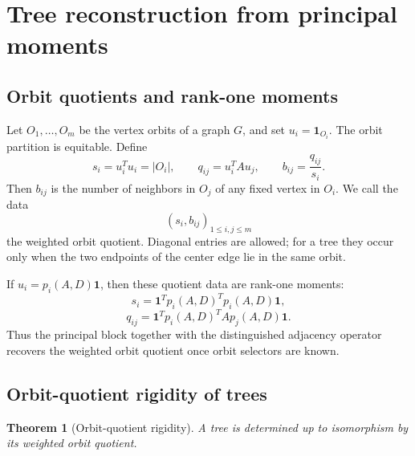 \documentclass[a4paper,fleqn]{cas-sc}
\newtheorem{theorem}{Theorem}[section]
\theoremstyle{definition}
\theoremstyle{remark}
\newcommand{\one}{\mathbf 1}
\begin{document}
\section{Tree reconstruction from principal moments}
\label{sec:tree-reconstruction}

\subsection{Orbit quotients and rank-one moments}

Let \(O_1,\ldots,O_m\) be the vertex orbits of a graph \(G\), and set
\(u_i=\one_{O_i}\).  The orbit partition is equitable.  Define
\[
        s_i=u_i^Tu_i=|O_i|,
        \qquad
        q_{ij}=u_i^TAu_j,
        \qquad
        b_{ij}=\frac{q_{ij}}{s_i}.
\]
Then \(b_{ij}\) is the number of neighbors in \(O_j\) of any fixed vertex in \(O_i\).
We call the data
\[
        (s_i,b_{ij})_{1\le i,j\le m}
\]
the weighted orbit quotient.  Diagonal entries are allowed; for a tree they occur
only when the two endpoints of the center edge lie in the same orbit.

If \(u_i=p_i(A,D)\one\), then these quotient data are rank-one moments:
\[
        s_i=\one^Tp_i(A,D)^Tp_i(A,D)\one,
\]
\[
        q_{ij}=\one^Tp_i(A,D)^TAp_j(A,D)\one.
\]
Thus the principal block together with the distinguished adjacency operator
recovers the weighted orbit quotient once orbit selectors are known.


\subsection{Orbit-quotient rigidity of trees}

\begin{theorem}[Orbit-quotient rigidity]
\label{thm:tree-quotient-rigidity}
A tree is determined up to isomorphism by its weighted orbit quotient.
\end{theorem}
\end{document}
